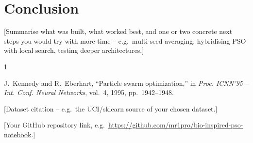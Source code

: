 \documentclass[conference]{IEEEtran}
\begin{document}
\section{Conclusion}
[Summarise what was built, what worked best, and one or two concrete next
steps you would try with more time -- e.g.\ multi-seed averaging,
hybridising PSO with local search, testing deeper architectures.]

\begin{thebibliography}{1}

J.~Kennedy and R.~Eberhart, ``Particle swarm optimization,'' in
\textit{Proc. ICNN'95 -- Int. Conf. Neural Networks}, vol.~4, 1995,
pp.~1942--1948.

[Dataset citation -- e.g.\ the UCI/sklearn source of your chosen dataset.]

[Your GitHub repository link, e.g.\ \url{https://github.com/mr1pro/bio-inspired-pso-notebook}.]

\end{thebibliography}
\end{document}
